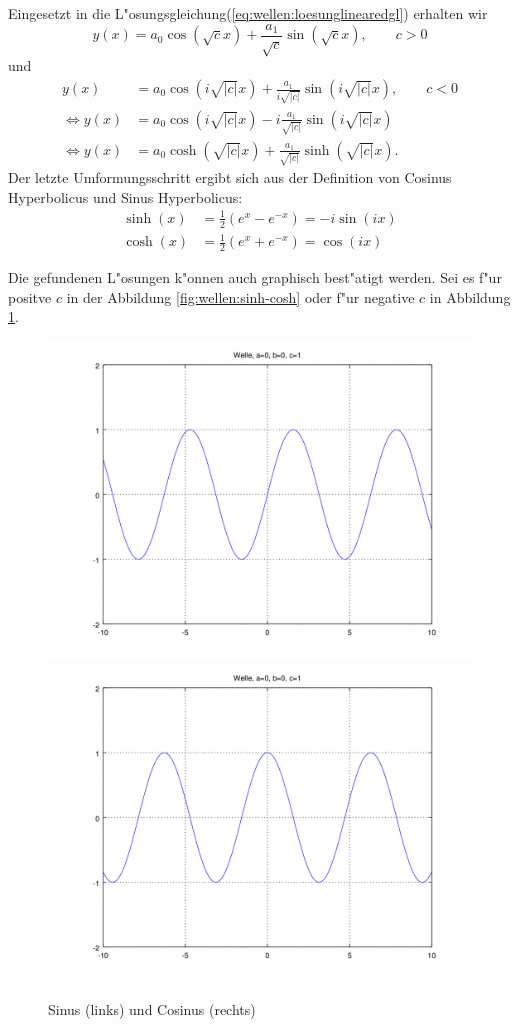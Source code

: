Eingesetzt in die L"osungsgleichung(\ref{eq:wellen:loesunglinearedgl}) erhalten 
wir
\begin{equation*}
	y(x) = a_0 \cos(\sqrt{c}x) + \frac{a_1}{\sqrt{c}} \sin(\sqrt{c}x), \qquad c 
	> 0
\end{equation*}
und
\begin{equation}
	\begin{split}
		y(x) &= a_0 \cos(i\sqrt{|c|}x) + 
		\frac{a_1}{i\sqrt{|c|}}\sin(i\sqrt{|c|}x), \qquad c < 0\\
		\Leftrightarrow
		y(x) &= a_0 \cos(i\sqrt{|c|}x) - 
		i\frac{a_1}{\sqrt{|c|}}\sin(i\sqrt{|c|}x)\\
		\Leftrightarrow
		y(x) &= a_0 \cosh(\sqrt{|c|}x) + 
		\frac{a_1}{\sqrt{|c|}}\sinh(\sqrt{|c|}x).
	\end{split}	
\end{equation}
Der letzte Umformungsschritt ergibt sich aus der Definition von Cosinus 
Hyperbolicus und Sinus Hyperbolicus:
\begin{equation*}
	\begin{split}
		\sinh(x) &= \frac{1}{2} (e^x - e^{-x}) = -i \sin(ix)\\
		\cosh(x) &= \frac{1}{2} (e^x + e^{-x}) = \cos (ix)
	\end{split}
\end{equation*}

Die gefundenen L"osungen k"onnen auch graphisch best"atigt werden. Sei es f"ur 
positve $c$ in der Abbildung \ref{fig:wellen:sinh-cosh} oder f"ur negative $c$ 
in Abbildung \ref{fig:wellen:sin-cos}.

\begin{figure}
	\includegraphics[width=0.5\hsize]{./wellen/images/basicfunctions/sin.png}
	\includegraphics[width=0.5\hsize]{./wellen/images/basicfunctions/cos.png}
	\caption{Sinus (links) und Cosinus (rechts)}
	\label{fig:wellen:sin-cos}
\end{figure}

